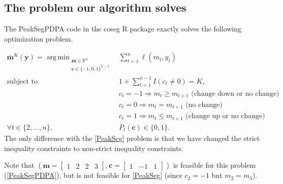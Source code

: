 \documentclass{article}
\DeclareMathOperator*{\argmin}{arg\,min}
\newcommand{\RR}{\mathbb R}
\begin{document}
\subsection{The problem our algorithm solves}

The PeakSegPDPA code in the coseg R package exactly solves the
following optimization problem.

\begin{align}
  \mathbf{\bar m}^K(\mathbf y) =
    \argmin_{\substack{
  \mathbf m\in\RR^{n}
\\
  \mathbf c\in\{-1,0,1\}^{n-1}
  }} &\ \ 
    \sum_{t=1}^n \ell( m_t,  y_t) 
  \label{PeakSegPDPA}
\\
    \text{subject to} &\ \  1+ \sum_{t=1}^{n-1} I(c_t \neq 0) = K, 
\nonumber\\
& \ \ c_t = -1 \Rightarrow m_{t} \geq m_{t+1} \text{ (change down or no change)}
\nonumber\\
& \ \ c_t = 0 \Rightarrow m_{t} = m_{t+1}  \text{ (no change)}
\nonumber\\
& \ \ c_t = 1 \Rightarrow m_{t} \leq m_{t+1} \text{ (change up or no change)}
\nonumber\\
\forall t\in\{2, \dots, n\}, &\ \ P_t(\mathbf c) \in\{0, 1\}.
\nonumber
\end{align}
The only difference with the \ref{PeakSeg} problem is that we have
changed the strict inequality constraints to non-strict inequality
constraints.

Note that 
$(\mathbf m = \left[\begin{array}{cccc}1 & 2 & 2 & 3 \end{array}\right],
  \mathbf c = \left[\begin{array}{ccc}  1 & -1 & 1 \end{array}\right])$
is feasible for this problem (\ref{PeakSegPDPA}), 
but is not feasible for \ref{PeakSeg} (since $c_2=-1$ but $m_2 = m_3$).
\end{document}
